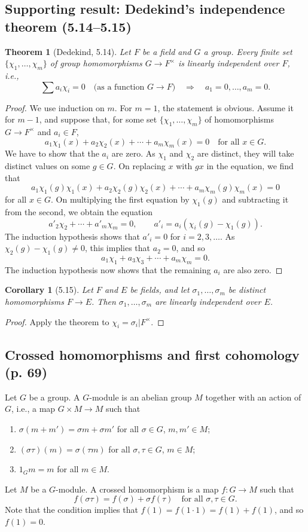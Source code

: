 \documentclass[UTF8,11pt,a4paper]{ctexart}
\newtheorem*{theorem}{Theorem}
\newtheorem*{corollary}{Corollary}
\theoremstyle{definition}\newtheorem*{definition}{Definition}
\theoremstyle{remark}\newtheorem*{remark}{Remark}
\begin{document}
\subsection*{Supporting result: Dedekind's independence theorem (5.14--5.15)}
\begin{theorem}[Dedekind, 5.14]
Let $F$ be a field and $G$ a group. Every finite set $\{\chi_1,\ldots,\chi_m\}$ of group homomorphisms $G\to F^\times$ is linearly independent over $F$, i.e.,
\[
\sum a_i\chi_i=0\quad\text{(as a function $G\to F$)}
\quad\Longrightarrow\quad a_1=0,\ldots,a_m=0.
\]
\end{theorem}
\begin{proof}
We use induction on $m$. For $m=1$, the statement is obvious. Assume it for $m-1$, and suppose that, for some set $\{\chi_1,\ldots,\chi_m\}$ of homomorphisms $G\to F^\times$ and $a_i\in F$,
\[
a_1\chi_1(x)+a_2\chi_2(x)+\cdots+a_m\chi_m(x)=0\quad\text{for all }x\in G.
\]
We have to show that the $a_i$ are zero. As $\chi_1$ and $\chi_2$ are distinct, they will take distinct values on some $g\in G$. On replacing $x$ with $gx$ in the equation, we find that
\[
a_1\chi_1(g)\chi_1(x)+a_2\chi_2(g)\chi_2(x)+\cdots+a_m\chi_m(g)\chi_m(x)=0
\]
for all $x\in G$. On multiplying the first equation by $\chi_1(g)$ and subtracting it from the second, we obtain the equation
\[
a'_2\chi_2+\cdots+a'_m\chi_m=0,\qquad a'_i=a_i(\chi_i(g)-\chi_1(g)).
\]
The induction hypothesis shows that $a'_i=0$ for $i=2,3,\ldots$. As $\chi_2(g)-\chi_1(g)\ne0$, this implies that $a_2=0$, and so
\[
a_1\chi_1+a_3\chi_3+\cdots+a_m\chi_m=0.
\]
The induction hypothesis now shows that the remaining $a_i$ are also zero.
\end{proof}
\begin{corollary}[5.15]
Let $F$ and $E$ be fields, and let $\sigma_1,\ldots,\sigma_m$ be distinct homomorphisms $F\to E$. Then $\sigma_1,\ldots,\sigma_m$ are linearly independent over $E$.
\end{corollary}
\begin{proof}
Apply the theorem to $\chi_i=\sigma_i|F^\times$.
\end{proof}

\subsection*{Crossed homomorphisms and first cohomology (p. 69)}
Let $G$ be a group. A $G$-module is an abelian group $M$ together with an action of $G$, i.e., a map $G\times M\to M$ such that
\begin{enumerate}[label=(\alph*)]
\item $\sigma(m+m')=\sigma m+\sigma m'$ for all $\sigma\in G$, $m,m'\in M$;
\item $(\sigma\tau)(m)=\sigma(\tau m)$ for all $\sigma,\tau\in G$, $m\in M$;
\item $1_Gm=m$ for all $m\in M$.
\end{enumerate}
Let $M$ be a $G$-module. A crossed homomorphism is a map $f:G\to M$ such that
\[
f(\sigma\tau)=f(\sigma)+\sigma f(\tau)\quad\text{for all }\sigma,\tau\in G.
\]
Note that the condition implies that $f(1)=f(1\cdot1)=f(1)+f(1)$, and so $f(1)=0$.
\end{document}
